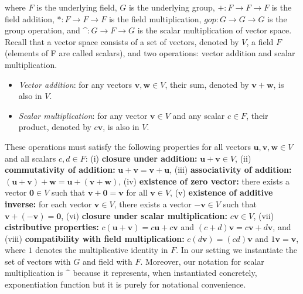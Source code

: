 \documentclass[conference,compsoc]{IEEEtran}
\begin{document}
\noindent
 where $F$ is the underlying field, $G$ is the underlying group,
 $+ : F \rightarrow F \rightarrow F$ is the field addition,
 $* : F \rightarrow F \rightarrow F$ is the field multiplication, 
 $gop : G \rightarrow G \rightarrow G$ is the group operation, and
 $\mbox{\textasciicircum}: G \rightarrow F \rightarrow G$ is the scalar multiplication of vector space.  
 Recall that a vector space consists of a set of 
 vectors, denoted by \(V\), a field \(F\) (elements of F are called scalars), and 
 two operations: vector addition and scalar multiplication.
\begin{itemize}
    \item \textit{Vector addition}: for any vectors \(\mathbf{v}, \mathbf{w} \in V\), their sum, denoted by \(\mathbf{v} + \mathbf{w}\), is also in \(V\).
    \item \textit{Scalar multiplication}: for any vector \(\mathbf{v} \in V\) and any scalar \(c \in F\), their product, denoted by \(c\mathbf{v}\), is also in \(V\).
\end{itemize}

These operations must satisfy the following properties for all vectors \(\mathbf{u}, \mathbf{v}, \mathbf{w} \in V\) and all scalars \(c, d \in F\):
(i) \textbf{closure under addition:} \(\mathbf{u} + \mathbf{v} \in V\), (ii) \textbf{commutativity of addition:} \(\mathbf{u} + \mathbf{v} = \mathbf{v} + \mathbf{u}\), 
(iii)  \textbf{associativity of addition:} \((\mathbf{u} + \mathbf{v}) + \mathbf{w} = \mathbf{u} + (\mathbf{v} + \mathbf{w})\), 
(iv) \textbf{existence of zero vector:} there exists a vector \(\mathbf{0} \in V\) such that \(\mathbf{v} + \mathbf{0} = \mathbf{v}\) for all \(\mathbf{v} \in V\), 
(v) \textbf{existence of additive inverse:} for each vector \(\mathbf{v} \in V\), there exists a vector \(-\mathbf{v} \in V\) such that \(\mathbf{v} + (-\mathbf{v}) = \mathbf{0}\),
(vi) \textbf{closure under scalar multiplication:} \(c\mathbf{v} \in V\), 
(vii) \textbf{cistributive properties:} \(c(\mathbf{u} + \mathbf{v}) = c\mathbf{u} + c\mathbf{v}\) and \((c + d)\mathbf{v} = c\mathbf{v} + d\mathbf{v}\), 
and (viii) \textbf{compatibility with field multiplication:} \(c(d\mathbf{v}) = (cd)\mathbf{v}\) and \(1\mathbf{v} = \mathbf{v}\), where \(1\) denotes the multiplicative identity in \(F\).
In our setting we instantiate the set of vectors with $G$ and field with $F$. 
Moreover, our notation for scalar multiplication is $\mbox{\textasciicircum}$ because it represents, 
when instantiated concretely, exponentiation function but it is purely for notational convenience. 
\end{document}
